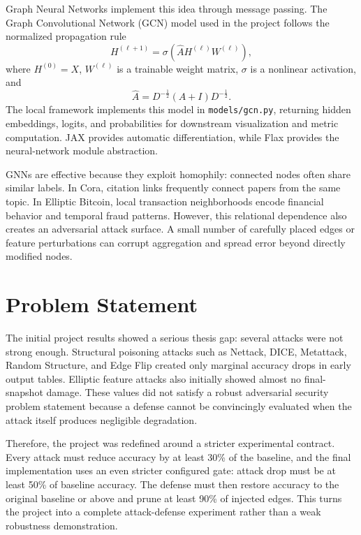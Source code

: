 \documentclass[12pt,oneside]{report}
\begin{document}
Graph Neural Networks implement this idea through message passing. The Graph Convolutional Network (GCN) model used in the project follows the normalized propagation rule
\begin{equation}
H^{(\ell+1)}=\sigma\left(\hat{A}H^{(\ell)}W^{(\ell)}\right),
\end{equation}
where \(H^{(0)}=X\), \(W^{(\ell)}\) is a trainable weight matrix, \(\sigma\) is a nonlinear activation, and
\begin{equation}
\hat{A}=D^{-\frac{1}{2}}(A+I)D^{-\frac{1}{2}}.
\end{equation}
The local framework implements this model in \texttt{models/gcn.py}, returning hidden embeddings, logits, and probabilities for downstream visualization and metric computation. JAX provides automatic differentiation, while Flax provides the neural-network module abstraction.

GNNs are effective because they exploit homophily: connected nodes often share similar labels. In Cora, citation links frequently connect papers from the same topic. In Elliptic Bitcoin, local transaction neighborhoods encode financial behavior and temporal fraud patterns. However, this relational dependence also creates an adversarial attack surface. A small number of carefully placed edges or feature perturbations can corrupt aggregation and spread error beyond directly modified nodes.

\section{Problem Statement}
The initial project results showed a serious thesis gap: several attacks were not strong enough. Structural poisoning attacks such as Nettack, DICE, Metattack, Random Structure, and Edge Flip created only marginal accuracy drops in early output tables. Elliptic feature attacks also initially showed almost no final-snapshot damage. These values did not satisfy a robust adversarial security problem statement because a defense cannot be convincingly evaluated when the attack itself produces negligible degradation.

Therefore, the project was redefined around a stricter experimental contract. Every attack must reduce accuracy by at least 30\% of the baseline, and the final implementation uses an even stricter configured gate: attack drop must be at least 50\% of baseline accuracy. The defense must then restore accuracy to the original baseline or above and prune at least 90\% of injected edges. This turns the project into a complete attack-defense experiment rather than a weak robustness demonstration.
\end{document}
